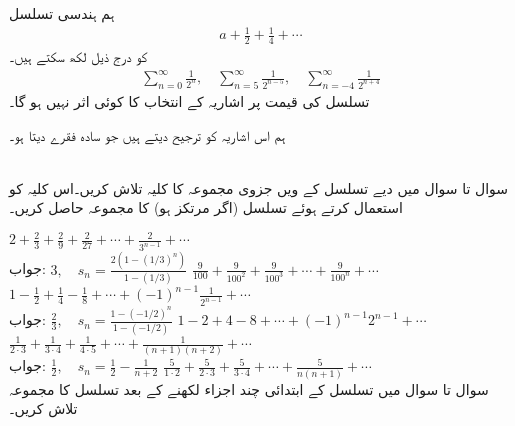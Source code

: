 ہم ہندسی تسلسل
\begin{align*}
a+\frac{1}{2}+\frac{1}{4}+\cdots
\end{align*}
کو درج ذیل لکھ سکتے ہیں۔
\begin{align*}
\sum_{n=0}^{\infty}\frac{1}{2^n},\quad \sum_{n=5}^{\infty}\frac{1}{2^{n-5}},\quad \sum_{n=-4}^{\infty}\frac{1}{2^{n+4}}
\end{align*}
تسلسل کی قیمت پر اشاریہ کے انتخاب کا کوئی اثر نہیں ہو گا۔

ہم اس اشاریہ کو ترجیح دیتے ہیں جو سادہ فقرے دیتا ہو۔
 

\\
سوال  تا سوال  میں دیے تسلسل کے  ویں جزوی مجموعہ کا کلیہ تلاش کریں۔اس کلیہ کو استعمال کرتے ہوئے تسلسل (اگر مرتکز ہو) کا مجموعہ حاصل کریں۔

$2+\frac{2}{3}+\frac{2}{9}+\frac{2}{27}+\cdots+\frac{2}{3^{n-1}}+\cdots$\\
جواب:\quad
$3,\quad s_n=\tfrac{2(1-(1/3)^n)}{1-(1/3)}$
$\frac{9}{100}+\frac{9}{100^2}+\frac{9}{100^3}+\cdots+\frac{9}{100^n}+\cdots$
$1-\frac{1}{2}+\frac{1}{4}-\frac{1}{8}+\cdots+(-1)^{n-1}\frac{1}{2^{n-1}}+\cdots$\\
جواب:\quad
$\tfrac{2}{3},\quad s_n=\tfrac{1-(-1/2)^n}{1-(-1/2)}$
$1-2+4-8+\cdots+(-1)^{n-1}2^{n-1}+\cdots$
$\frac{1}{2\cdot 3}+\frac{1}{3\cdot 4}+\frac{1}{4\cdot 5}+\cdots+\frac{1}{(n+1)(n+2)}+\cdots$\\
جواب:\quad
$\tfrac{1}{2},\quad s_n=\tfrac{1}{2}-\tfrac{1}{n+2}$
$\frac{5}{1\cdot 2}+\frac{5}{2\cdot 3}+\frac{5}{3\cdot 4}+\cdots+\frac{5}{n(n+1)}+\cdots$
\\
سوال  تا سوال  میں تسلسل کے ابتدائی چند اجزاء لکھنے کے بعد تسلسل کا مجموعہ تلاش کریں۔

